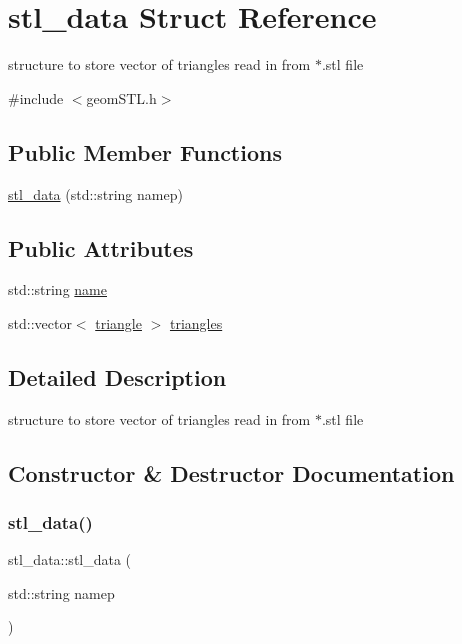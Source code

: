 \hypertarget{structstl__data}{}\section{stl\+\_\+data Struct Reference}
\label{structstl__data}


structure to store vector of triangles read in from $\ast$.stl file  




{\ttfamily \#include $<$geom\+S\+T\+L.\+h$>$}

\subsection*{Public Member Functions}
\begin{DoxyCompactItemize}
\item 
\mbox{\hyperlink{structstl__data_aba1cf49ad354bf01462ff293cbc9141a}{stl\+\_\+data}} (std\+::string namep)
\end{DoxyCompactItemize}
\subsection*{Public Attributes}
\begin{DoxyCompactItemize}
\item 
std\+::string \mbox{\hyperlink{structstl__data_ab7c4953a186ecd969ceabd312b84c27d}{name}}
\item 
std\+::vector$<$ \mbox{\hyperlink{structtriangle}{triangle}} $>$ \mbox{\hyperlink{structstl__data_acd94c025a7af5a9c8eaabd40db263b25}{triangles}}
\end{DoxyCompactItemize}


\subsection{Detailed Description}
structure to store vector of triangles read in from $\ast$.stl file 

\subsection{Constructor \& Destructor Documentation}
\mbox{\label{structstl__data_aba1cf49ad354bf01462ff293cbc9141a}} 
\subsubsection{\texorpdfstring{stl\+\_\+data()}{stl\_data()}}
{\footnotesize\ttfamily stl\+\_\+data\+::stl\+\_\+data (\begin{DoxyParamCaption}\item[{std\+::string}]{namep }\end{DoxyParamCaption})\hspace{0.3cm}{\ttfamily [inline]}}



